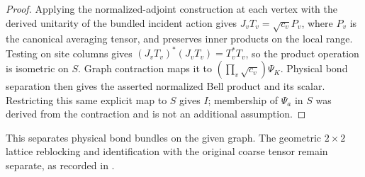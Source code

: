 \begin{proof}\leanok
    Applying the normalized-adjoint construction at each vertex with the
    derived unitarity of the bundled incident action gives
    $J_vT_v=\sqrt{c_v}P_v$, where $P_v$ is the canonical averaging tensor,
    and preserves inner products on the local range. Testing on site columns
    gives $(J_vT_v)^*(J_vT_v)=T_v^*T_v$, so the product operation is isometric
    on $S$. Graph contraction maps it to
    $(\prod_v\sqrt{c_v})\Psi_K$. Physical bond separation then gives the
    asserted normalized Bell product and its scalar. Restricting this same
    explicit map to $S$ gives $I$; membership of $\Psi_a$ in $S$ was derived
    from the contraction and is not an additional assumption.
\end{proof}

This separates physical bond bundles on the given graph. The geometric
$2\times2$ lattice reblocking and identification with the original coarse
tensor remain separate, as recorded in
\cite{gap:scp10_general_group_physical_blocking}.
